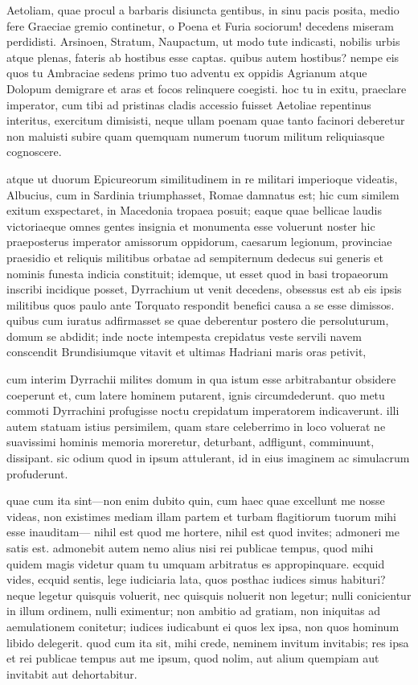  Aetoliam, quae procul a barbaris disiuncta gentibus, in sinu pacis posita, medio fere Graeciae gremio continetur, o Poena et Furia sociorum! decedens miseram perdidisti. Arsinoen, Stratum, Naupactum, ut modo tute indicasti, nobilis urbis atque plenas, fateris ab hostibus esse captas. quibus autem hostibus? nempe eis quos tu Ambraciae sedens primo tuo adventu ex oppidis Agrianum atque Dolopum demigrare et aras et focos relinquere coegisti. hoc tu in exitu, praeclare imperator, cum tibi ad pristinas cladis accessio fuisset Aetoliae repentinus interitus, exercitum dimisisti, neque ullam poenam quae tanto facinori deberetur non maluisti subire quam quemquam numerum tuorum militum reliquiasque cognoscere.

 atque ut duorum Epicureorum similitudinem in re militari imperioque videatis, Albucius, cum in Sardinia triumphasset, Romae damnatus est; hic cum similem exitum exspectaret, in Macedonia tropaea posuit; eaque quae bellicae laudis victoriaeque omnes gentes insignia et monumenta esse voluerunt noster hic praeposterus imperator amissorum oppidorum, caesarum legionum, provinciae praesidio et reliquis militibus orbatae ad sempiternum dedecus sui generis et nominis funesta indicia constituit; idemque, ut esset quod in basi tropaeorum inscribi incidique posset, Dyrrachium ut venit decedens, obsessus est ab eis ipsis militibus quos paulo ante Torquato respondit benefici causa a se esse dimissos. quibus cum iuratus adfirmasset se quae deberentur postero die persoluturum, domum se abdidit; inde nocte intempesta crepidatus veste servili navem conscendit Brundisiumque vitavit et ultimas Hadriani maris oras petivit,

 cum interim Dyrrachii milites domum in qua istum esse arbitrabantur obsidere coeperunt et, cum latere hominem putarent, ignis circumdederunt. quo metu commoti Dyrrachini profugisse noctu crepidatum imperatorem indicaverunt. illi autem statuam istius persimilem, quam stare celeberrimo in loco voluerat ne suavissimi hominis memoria moreretur, deturbant, adfligunt, comminuunt, dissipant. sic odium quod in ipsum attulerant, id in eius imaginem ac simulacrum profuderunt.

 quae cum ita sint—non enim dubito quin, cum haec quae excellunt me nosse videas, non existimes mediam illam partem et turbam flagitiorum tuorum mihi esse inauditam— nihil est quod me hortere, nihil est quod invites; admoneri me satis est. admonebit autem nemo alius nisi rei publicae tempus, quod mihi quidem magis videtur quam tu umquam arbitratus es appropinquare. ecquid vides, ecquid sentis, lege iudiciaria lata, quos posthac iudices simus habituri? neque legetur quisquis voluerit, nec quisquis noluerit non legetur; nulli conicientur in illum ordinem, nulli eximentur; non ambitio ad gratiam, non iniquitas ad aemulationem conitetur; iudices iudicabunt ei quos lex ipsa, non quos hominum libido delegerit. quod cum ita sit, mihi crede, neminem invitum invitabis; res ipsa et rei publicae tempus aut me ipsum, quod nolim, aut alium quempiam aut invitabit aut dehortabitur.


